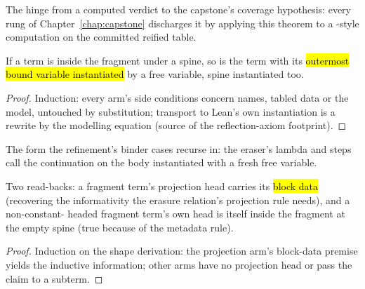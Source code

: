 \begin{remark}
 The hinge from a computed verdict to the capstone's coverage hypothesis: every rung of
Chapter~\ref{chap:capstone} discharges it by applying this theorem to a -style
computation on the committed reified table.
\end{remark}

\begin{lemma}
\label{lem:SupportedTm-instantiate1}
\leanok
{}
 If a term is inside the fragment under a spine, so is the term with its
\hl{outermost bound variable instantiated} by a free variable, spine instantiated too.
\end{lemma}
\begin{proof}
\leanok
{}
 Induction: every arm's side conditions concern names, tabled data or the model,
untouched by substitution; transport to Lean's own instantiation is a rewrite by the modelling
equation (source of the reflection-axiom footprint).
\end{proof}

\begin{remark}
 The form the refinement's binder cases recurse in: the eraser's lambda and 
steps call the continuation on the body instantiated with a fresh free variable.
\end{remark}

\begin{lemma}
\label{lem:Supported-projInfo}
\leanok
{}
 Two read-backs: a fragment term's projection head carries its \hl{block data}
(recovering the informativity the erasure relation's projection rule needs), and a non-constant-
headed fragment term's own head is itself inside the fragment at the empty spine (true because of
the metadata rule).
\end{lemma}
\begin{proof}
\leanok
{}
 Induction on the shape derivation: the projection arm's block-data premise yields the
inductive information; other arms have no projection head or pass the claim to a subterm.
\end{proof}

